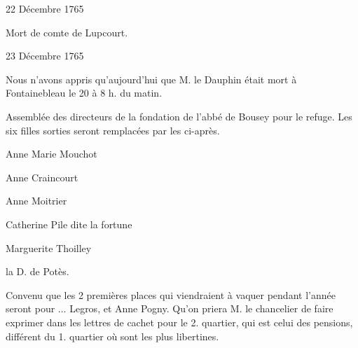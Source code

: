                      \begin{diary}{22 Décembre 1765}{}
                        
                         Mort de 
                           comte de Lupcourt. \bigskip
        
        
                     \end{diary}
                     
                     \begin{diary}{23 Décembre 1765}{}
                        
                         Nous n'avons appris qu'aujourd'hui que M.
                              le Dauphin était mort à Fontainebleau
                           le
                              20 à 8 h. du matin. \bigskip
        
        
                         Assemblée des directeurs de la fondation
                           de l'abbé de Bousey pour le
                              refuge.
                           Les six filles sorties seront remplacées
                           par les ci-après. 
                              
                              
                                 Anne Marie Mouchot
                              
                              
                                 Anne Craincourt
                              
                              
                                 Anne Moitrier
                              
                              
                                 Catherine Pile dite la
                                    fortune
                              
                              
                                 Marguerite Thoilley
                              
                              
                                 la D. de
                                    Potès.
                              
                           
                           Convenu que les 2 premières places
                           qui viendraient à vaquer pendant l'année
                           seront pour ... Legros, et
                              Anne Pogny.
                           Qu'on priera M. le chancelier de faire exprimer
                           dans les lettres de cachet pour le 2.
                           quartier, qui est celui des pensions, différent
                           du 1. quartier où sont les plus libertines.
                        \bigskip
        
        
                     \end{diary}

